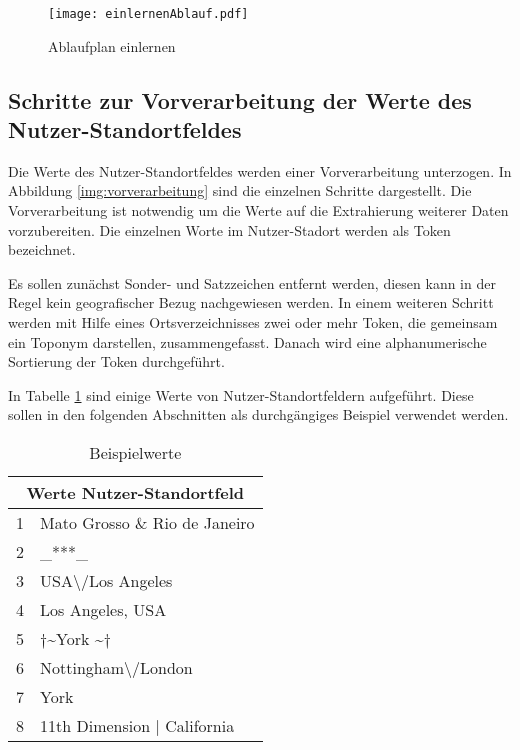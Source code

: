 			\begin{figure}[!htb]
				\begin{center}
					\texttt{[image: einlernenAblauf.pdf]}
					\caption{Ablaufplan einlernen}
					\label{img:einlernenAblauf}
				\end{center}
			\end{figure}
			\clearpage

		\subsection{Schritte zur Vorverarbeitung der Werte des Nutzer-Standortfeldes} \label{sub:Vorv}

			Die Werte des Nutzer-Standortfeldes werden einer Vorverarbeitung unterzogen.
			In Abbildung \ref{img:vorverarbeitung} sind die einzelnen Schritte dargestellt.
			Die Vorverarbeitung ist notwendig um die Werte auf die Extrahierung weiterer Daten vorzubereiten.
			Die einzelnen Worte im Nutzer-Stadort werden als Token bezeichnet. 
			
			Es sollen zunächst Sonder- und Satzzeichen entfernt werden, diesen kann in der Regel kein geografischer Bezug nachgewiesen werden.
			In einem weiteren Schritt werden mit Hilfe eines Ortsverzeichnisses zwei oder mehr Token, die gemeinsam ein Toponym darstellen, zusammengefasst.
			Danach wird eine alphanumerische Sortierung der Token durchgeführt.

			In Tabelle \ref{tab:VorverarbeitungBsp1} sind einige Werte von Nutzer-Standortfeldern aufgeführt.
			Diese sollen in den folgenden Abschnitten als durchgängiges Beispiel verwendet werden.

				\begin{table}[h]
					\centering
					\caption{Beispielwerte}
					\label{tab:VorverarbeitungBsp1}
					\begin{tabular}{|l|l|}
					\hline 
					\multicolumn{2}{|c|}{\textbf{Werte Nutzer-Standortfeld}} \\ \hline \hline
					1&Mato Grosso \& Rio de Janeiro                      			\\ \hline
					2&\_***\_                                         			\\ \hline
					3&USA\textbackslash /Los Angeles                  			\\ \hline
					4&Los Angeles, USA                                			\\ \hline
					5&$\dagger$\textasciitilde York \textasciitilde$\dagger$      \\ \hline
					6&Nottingham\textbackslash /London                			\\ \hline
					7&York                                            			\\ \hline
					8&11th Dimension | California 					\\ \hline	
					\end{tabular}
				\end{table} 
			 
